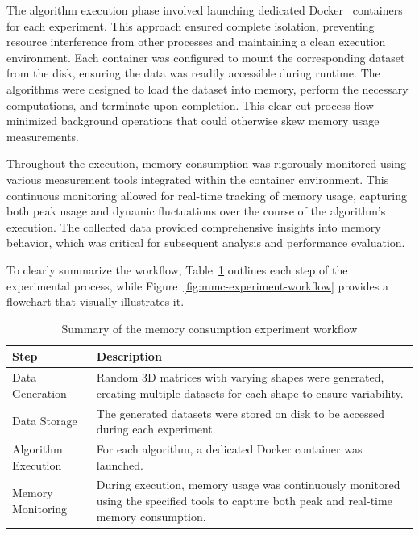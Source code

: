 The algorithm execution phase involved launching dedicated Docker~\cite{docker} containers for each experiment.
This approach ensured complete isolation, preventing resource interference from other processes and maintaining a clean execution environment.
Each container was configured to mount the corresponding dataset from the disk, ensuring the data was readily accessible during runtime.
The algorithms were designed to load the dataset into memory, perform the necessary computations, and terminate upon completion.
This clear-cut process flow minimized background operations that could otherwise skew memory usage measurements.

Throughout the execution, memory consumption was rigorously monitored using various measurement tools integrated within the container environment.
This continuous monitoring allowed for real-time tracking of memory usage, capturing both peak usage and dynamic fluctuations over the course of the algorithm's execution.
The collected data provided comprehensive insights into memory behavior, which was critical for subsequent analysis and performance evaluation.

To clearly summarize the workflow, Table~\ref{tab:mmc-experimental-workflow} outlines each step of the experimental process, while Figure~\ref{fig:mmc-experiment-workflow} provides a flowchart that visually illustrates it.

\begin{table}[h]
    \centering
    \renewcommand{\arraystretch}{1.4}
    \setlength{\tabcolsep}{10pt}
    \begin{tabular}{|>{\raggedright\arraybackslash}p{3.5cm}|>{\raggedright\arraybackslash}p{7cm}|}
        \hline
        \textbf{Step}       & \textbf{Description}                                                                                                                       \\ \hline
        Data Generation     & Random 3D matrices with varying shapes were generated, creating multiple datasets for each shape to ensure variability.                    \\ \hline
        Data Storage        & The generated datasets were stored on disk to be accessed during each experiment.                                                          \\ \hline
        Algorithm Execution & For each algorithm, a dedicated Docker container was launched.                                                                             \\ \hline
        Memory Monitoring   & During execution, memory usage was continuously monitored using the specified tools to capture both peak and real-time memory consumption. \\ \hline
    \end{tabular}
    \caption{Summary of the memory consumption experiment workflow}
    \label{tab:mmc-experimental-workflow}
\end{table}

